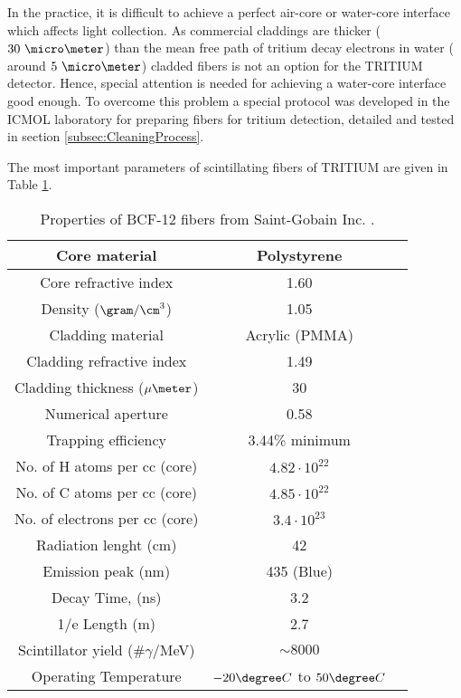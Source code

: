In the practice, it is difficult to achieve a perfect air-core or water-core interface which affects light collection. As commercial claddings are thicker ($30~\micro \meter$) than the mean free path of tritium decay electrons in water ( around $5~\micro\meter$) cladded fibers is not an option for the TRITIUM detector. Hence, special attention is needed for achieving a water-core interface good enough. To overcome this problem a special protocol was developed in the ICMOL laboratory for preparing fibers for tritium detection, detailed and tested in section \ref{subsec:CleaningProcess}.

The most important parameters of scintillating fibers of TRITIUM are given in Table \ref{tab:ParametersFibersBCF12}.

\begin{table}[h]
\begin{center}
\begin{tabular}{|c|c|c|}
\hline \hline 
Core material & Polystyrene \\ \hline
Core refractive index & 1.60 \\ \hline
Density ($\gram/\cm^3$) & 1.05 \\ \hline
Cladding material & Acrylic (PMMA) \\ \hline
Cladding refractive index & 1.49 \\ \hline
Cladding thickness ($\mu\meter$) & 30 \\ \hline
Numerical aperture & 0.58 \\ \hline
Trapping efficiency & 3.44\% minimum \\ \hline
No. of H atoms per cc (core) & $4.82 \cdot{} 10^{22}$ \\ \hline
No. of C atoms per cc (core) & $4.85 \cdot{} 10^{22}$ \\ \hline
No. of electrons per cc (core) & $3.4 \cdot{} 10^{23}$ \\ \hline
Radiation lenght (cm) & 42 \\ \hline
Emission peak (nm) & 435 (Blue) \\ \hline
Decay Time, (ns) & 3.2 \\ \hline
1/e Length (m) & 2.7 \\ \hline
Scintillator yield (\#$\gamma$/MeV) & $\sim 8000$ \\ \hline
Operating Temperature & $-20\degree C$ to $50\degree C$ \\ \hline
\end{tabular}
\caption{Properties of BCF-12 fibers from Saint-Gobain Inc. \cite{DataSheetBCF12Fiber}.}
\label{tab:ParametersFibersBCF12}
\end{center}
\end{table}


